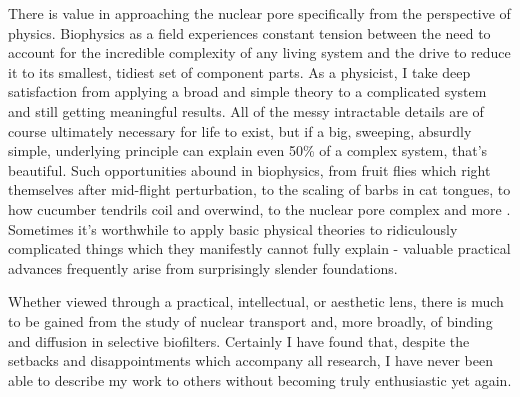 There is value in approaching the nuclear pore specifically from the perspective of physics.  Biophysics as a field experiences constant tension between the need to account for the incredible complexity of any living system and the drive to reduce it to its smallest, tidiest set of component parts.  As a physicist, I take deep satisfaction from applying a broad and simple theory to a complicated system and still getting meaningful results.  All of the messy intractable details are of course ultimately necessary for life to exist, but if a big, sweeping, absurdly simple, underlying principle can explain even 50\% of a complex system, that's beautiful.  Such opportunities abound in biophysics, from fruit flies which right themselves after mid-flight perturbation, to the scaling of barbs in cat tongues, to how cucumber tendrils coil and overwind, to the nuclear pore complex and more \cite{ristroph12,noel18,gerbode12}.  Sometimes it's worthwhile to apply basic physical theories to ridiculously complicated things which they manifestly cannot fully explain - valuable practical advances frequently arise from surprisingly slender foundations.

Whether viewed through a practical, intellectual, or aesthetic lens, there is much to be gained from the study of nuclear transport and, more broadly, of binding and diffusion in selective biofilters.  Certainly I have found that, despite the setbacks and disappointments which accompany all research, I have never been able to describe my work to others without becoming truly enthusiastic yet again.




